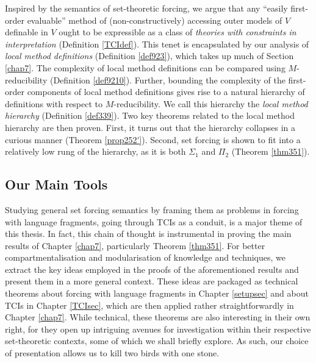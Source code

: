 \documentclass[12pt, twoside]{memoir}
\numberwithin{equation}{section}
\theoremstyle{definition}
\theoremstyle{remark}
\theoremstyle{definition}
\theoremstyle{definition}
\theoremstyle{definition}
\theoremstyle{remark}
\begin{document}
Inspired by the semantics of set-theoretic forcing, we argue that any ``easily first-order evaluable'' method of (non-constructively) accessing outer models of $V$ definable in $V$ ought to be expressible as a class of \textit{theories with constraints in interpretation} (Definition \ref{TCIdef}). This tenet is encapsulated by our analysis of \textit{local method definitions} (Definition \ref{def923}), which takes up much of Section \ref{chap7}. The complexity of local method definitions can be compared using $M$-reducibility (Definition \ref{def9210}). Further, bounding the complexity of the first-order components of local method definitions gives rise to a natural hierarchy of definitions with respect to $M$-reducibility. We call this hierarchy the \textit{local method hierarchy} (Definition \ref{def339}). Two key theorems related to the local method hierarchy are then proven. First, it turns out that the hierarchy collapses in a curious manner (Theorem \ref{prop252'}). Second, set forcing is shown to fit into a relatively low rung of the hierarchy, as it is both $\Sigma_1$ and $\Pi_2$ (Theorem \ref{thm351}).

\subsection*{Our Main Tools}

Studying general set forcing semantics by framing them as problems in forcing with language fragments, going through TCIs as a conduit, is a major theme of this thesis. In fact, this chain of thought is instrumental in proving the main results of Chapter \ref{chap7}, particularly Theorem \ref{thm351}. For better compartmentalisation and modularisation of knowledge and techniques, we extract the key ideas employed in the proofs of the aforementioned results and present them in a more general context. These ideas are packaged as technical theorems about forcing with language fragments in Chapter \ref{setupsec} and about TCIs in Chapter \ref{TCIsec}, which are then applied rather straightforwardly in Chapter \ref{chap7}. While technical, these theorems are also interesting in their own right, for they open up intriguing avenues for investigation within their respective set-theoretic contexts, some of which we shall briefly explore. As such, our choice of presentation allows us to kill two birds with one stone. 
\end{document}
